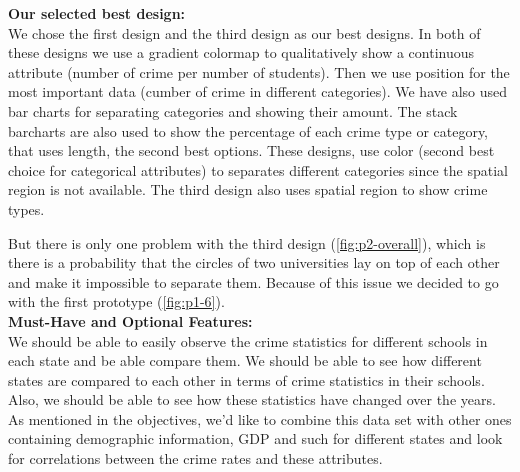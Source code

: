 \documentclass[12pt]{article}
\begin{document}
\noindent
\textbf{Our selected best design:}\\
We chose the first design and the third design as our best designs. In both of these designs we use a gradient colormap to qualitatively show a continuous attribute (number of crime per number of students). Then we use position for the most important data (cumber of crime in different categories). We have also used bar charts for separating categories and showing their amount. The stack barcharts are also used to show the percentage of each crime type or category, that uses length, the second best options. These designs, use color (second best choice for categorical attributes) to separates different categories since the spatial region is not available. The third design also uses spatial region to show crime types. 

But there is only one problem with the third design (\cref{fig:p2-overall}), which is there is a probability that the circles of two universities lay on top of each other and make it impossible to separate them. Because of this issue we decided to go with the first prototype (\cref{fig:p1-6}).
\\

\noindent
\textbf{Must-Have and Optional Features:}\\
We should be able to easily observe the crime statistics for different schools in each state and be able compare them. We should be able to see how different states are compared to each other in terms of crime statistics in their schools. Also, we should be able to see how these statistics have changed over the years.\\
As mentioned in the objectives, we'd like to combine this data set with other ones containing demographic information, GDP and such for different states and look for correlations between the crime rates and these attributes.

 

\end{document}
